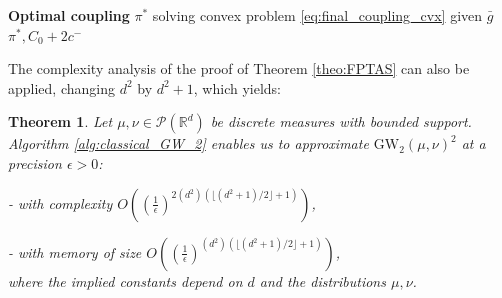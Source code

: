 \documentclass{article}
\newcommand{\R}{\mathbb{R}}
\newcommand{\1}{\mathbf{1}}
\newcommand{\GW}{\mathrm{GW}}
\renewcommand{\P}{\mathcal{P}}
\newtheorem{theorem}{Theorem}
\theoremstyle{definition}
\theoremstyle{remark}
\begin{document}
\begin{appendices}
\begin{algorithm}
\begin{algorithmic}[1]
\State  \textbf{Optimal coupling} $\pi^*$ solving convex problem \eqref{eq:final_coupling_cvx} given $\bar{g}$
\State\Return $\pi^*,C_0+2c^-$
\end{algorithmic}
\end{algorithm}

The complexity analysis of the proof of Theorem \ref{theo:FPTAS} can also be applied, changing $d^2$ by $d^2+1$, which yields:
\begin{theorem}\label{theo:FPTAS_GW_2}
    Let $\mu,\nu\in\P(\R^d)$ be discrete measures with bounded support. Algorithm \ref{alg:classical_GW_2} enables us to approximate $\GW_2(\mu,\nu)^2$ at a precision $\epsilon>0$:
    
    
    - with complexity $O\left(\left(\frac{1}{\epsilon}\right)^{2(d^2)(\lfloor (d^2+1)/2\rfloor+1)}\right)$,

    - with  memory of size $O\left(\left(\frac{1}{\epsilon}\right)^{(d^2)(\lfloor (d^2+1)/2\rfloor+1)}\right)$,\\
    where the implied constants depend on $d$ and the distributions $\mu,\nu$.
\end{theorem}







\newpage

\end{appendices}
\end{document}
